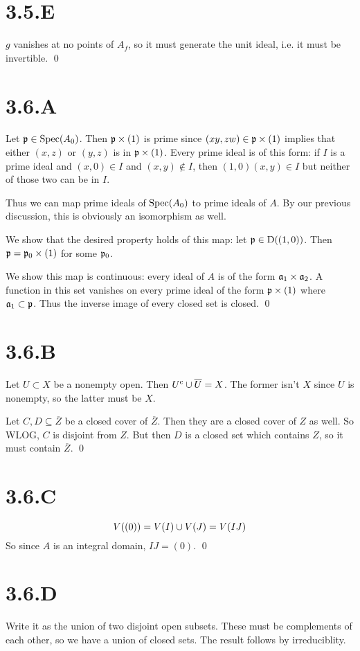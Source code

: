 \documentclass{article}
\begin{document}
\section{3.5.E}
$g$ vanishes at no points of $A_f$, so it must generate the unit ideal, i.e. it must be invertible. \qed

\section{3.6.A}
Let $\mathfrak{p} \in \operatorname{Spec}(A_0)$. Then $\mathfrak{p} \times (1)$ is prime since $(xy,zw) \in \mathfrak{p} \times (1)$ implies that either $(x,z)$ or $(y,z)$ is in $\mathfrak{p} \times (1)$. Every prime ideal is of this form: if $I$ is a prime ideal and $(x, 0) \in I$ and $(x,y) \not \in I$, then $(1,0)(x, y) \in I$ but neither of those two can be in $I$.

Thus we can map prime ideals of $\operatorname{Spec}(A_0)$ to prime ideals of $A$. By our previous discussion, this is obviously an isomorphism as well.

We show that the desired property holds of this map: let $\mathfrak{p} \in \operatorname{D}((1,0))$. Then $\mathfrak{p} = \mathfrak{p}_0 \times (1)$ for some $\mathfrak{p}_0$.

We show this map is continuous: every ideal of $A$ is of the form $\mathfrak{a}_1 \times \mathfrak{a}_2$. A function in this set vanishes on every prime ideal of the form $\mathfrak{p} \times (1)$ where $\mathfrak{a}_1 \subset \mathfrak{p}$. Thus the inverse image of every closed set is closed. \qed

\section{3.6.B}
Let $U \subset X$ be a nonempty open. Then $U^{\text{c}} \cup \overline{U}=X$. The former isn't $X$ since $U$ is nonempty, so the latter must be $X$.

Let $C, D \subseteq \overline{Z}$ be a closed cover of $\overline{Z}$.
Then they are a closed cover of $Z$ as well. So WLOG, $C$ is disjoint from $Z$. But then $D$ is a closed set which contains $Z$, so it must contain $\overline{Z}$. \qed

\section{3.6.C}
\[V((0))=V(I) \cup V(J)=V(IJ)\]
So since $A$ is an integral domain, $IJ=(0)$. \qed

\section{3.6.D}
Write it as the union of two disjoint open subsets. These must be complements of each other, so we have a union of closed sets. The result follows by irreduciblity.
\end{document}
